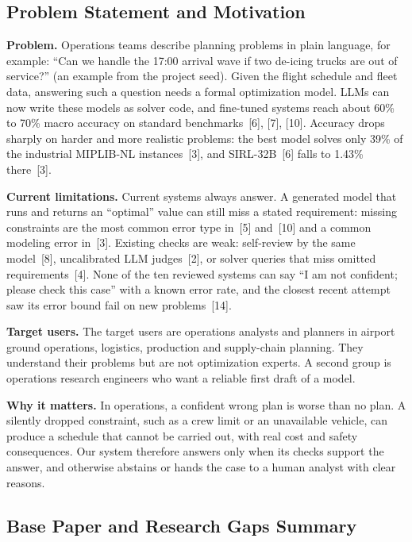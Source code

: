 \documentclass[11pt,a4paper]{article}
\begin{document}
\subsection{Problem Statement and Motivation}

\textbf{Problem.} Operations teams describe planning problems in plain language, for example: ``Can we handle the 17:00 arrival wave if two de-icing trucks are out of service?'' (an example from the project seed). Given the flight schedule and fleet data, answering such a question needs a formal optimization model. LLMs can now write these models as solver code, and fine-tuned systems reach about 60\% to 70\% macro accuracy on standard benchmarks~[6], [7], [10]. Accuracy drops sharply on harder and more realistic problems: the best model solves only 39\% of the industrial MIPLIB-NL instances~[3], and SIRL-32B~[6] falls to 1.43\% there~[3].

\textbf{Current limitations.} Current systems always answer. A generated model that runs and returns an ``optimal'' value can still miss a stated requirement: missing constraints are the most common error type in~[5] and~[10] and a common modeling error in~[3]. Existing checks are weak: self-review by the same model~[8], uncalibrated LLM judges~[2], or solver queries that miss omitted requirements~[4]. None of the ten reviewed systems can say ``I am not confident; please check this case'' with a known error rate, and the closest recent attempt saw its error bound fail on new problems~[14].

\textbf{Target users.} The target users are operations analysts and planners in airport ground operations, logistics, production and supply-chain planning. They understand their problems but are not optimization experts. A second group is operations research engineers who want a reliable first draft of a model.

\textbf{Why it matters.} In operations, a confident wrong plan is worse than no plan. A silently dropped constraint, such as a crew limit or an unavailable vehicle, can produce a schedule that cannot be carried out, with real cost and safety consequences. Our system therefore answers only when its checks support the answer, and otherwise abstains or hands the case to a human analyst with clear reasons.

\subsection{Base Paper and Research Gaps Summary}
\end{document}
